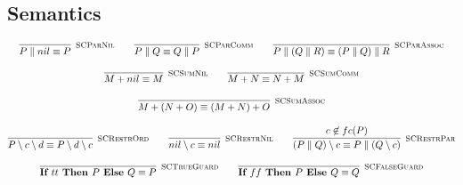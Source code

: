
\subsection{Semantics}
	\begin{gather*}
    \infer[\mbox{\footnotesize\scshape SCParNil}]{P \parallel nil \equiv P}{} \qquad
    \infer[\mbox{\footnotesize\scshape SCParComm}]{P \parallel Q \equiv Q \parallel P}{} \qquad
    \infer[\mbox{\footnotesize\scshape SCParAssoc}]{P \parallel (Q \parallel R) \equiv (P \parallel Q) \parallel R}{} \\[0.3cm]
    \infer[\mbox{\footnotesize\scshape SCSumNil}]{M + nil \equiv M}{} \qquad
    \infer[\mbox{\footnotesize\scshape SCSumComm}]{M + N \equiv N + M}{} \\[0.3cm]
    \infer[\mbox{\footnotesize\scshape SCSumAssoc}]{M + (N + O) \equiv (M + N) + O}{} \\[0.3cm]
    \infer[\mbox{\footnotesize\scshape SCRestrOrd}]{P \setminus c \setminus d \equiv P \setminus d \setminus c}{} \qquad 
    \infer[\mbox{\footnotesize\scshape SCRestrNil}]{nil \setminus c \equiv nil}{} \qquad 
    \infer[\mbox{\footnotesize\scshape SCRestrPar}]{(P \parallel Q) \setminus c \equiv P \parallel (Q \setminus c)}{c \not\in fc(P)} \\[0.3cm]
    \infer[\mbox{\footnotesize\scshape SCTrueGuard}]{\ITE{tt}{P}{Q} \equiv P}{} \qquad
    \infer[\mbox{\footnotesize\scshape SCFalseGuard}]{\ITE{ff}{P}{Q} \equiv Q}{} 
	\end{gather*}	





